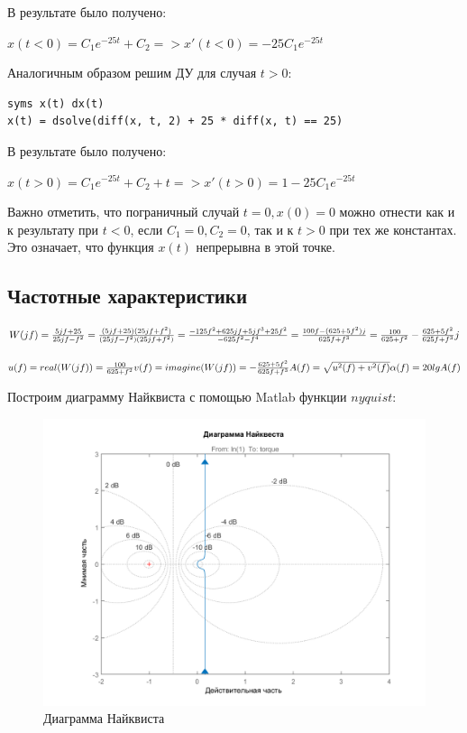 \documentclass[14pt,a4paper,report]{report}
\begin{document}
В результате было получено:

$x(t<0)=C_1e^{-25t}+C_2 => x'(t<0)=-25C_1e^{-25t}$

Аналогичным образом решим ДУ для случая $t>0$:

\begin{lstlisting}
syms x(t) dx(t)
x(t) = dsolve(diff(x, t, 2) + 25 * diff(x, t) == 25)
\end{lstlisting}

В результате было получено:

$x(t>0)=C_1e^{-25t}+C_2+t => x'(t>0)=1-25C_1e^{-25t}$

Важно отметить, что пограничный случай $t=0, x(0)=0$ можно отнести как и к результату при $t<0$, если $C_1=0, C_2=0$, так и к $t>0$ при тех же константах. Это означает, что функция $x(t)$ непрерывна в этой точке.

\subsection{Частотные характеристики}

$
\\
W(jf)=\frac{5jf+25}{25jf-f^2}=\frac{(5jf+25)(25jf+f^2)}{(25jf-f^2)(25jf+f^2)}=\frac{-125f^2+625jf+5jf^3+25f^2}{-625f^2-f^4}=\frac{100f-(625+5f^2)j}{625f+f^3}=\frac{100}{625+f^2}-\frac{625+5f^2}{625f+f^3}j$

$
\\
u(f)=real(W(jf))=\frac{100}{625+f^2}\\
v(f)=imagine(W(jf))=-\frac{625+5f^2}{625f+f^3}\\
A(f)=\sqrt{u^2(f) + v^2(f)}\\
\alpha(f)=20lgA(f)\\
$

\clearpage

Построим диаграмму Найквиста с помощью Matlab функции $nyquist$:

\begin{figure}[h!]
	\centering
	\includegraphics[scale = 0.70]{images/nyquist.png}
	\caption{Диаграмма Найквиста}
	\label{image:3}
\end{figure}
\end{document}
